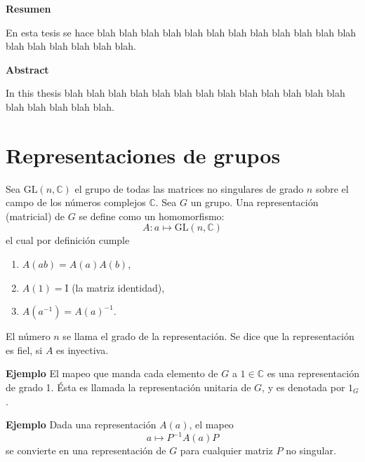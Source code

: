 \documentclass[12pt]{book}
\theoremstyle{definition}
\newcounter{in}
\newcounter{ini}
\begin{document}
\thispagestyle{empty}
\begin{flushleft}
  {\bfseries\Large Resumen}
\end{flushleft}

En esta tesis se hace blah blah blah blah blah blah blah blah blah
blah blah blah blah blah blah blah blah blah.

\vspace{2cm}

\begin{flushleft}
  {\bfseries\Large Abstract}
\end{flushleft}

In this thesis blah blah blah blah blah blah blah blah blah
blah blah blah blah blah blah blah blah blah.

 \newpage \thispagestyle{empty}

\chapter{Representaciones de grupos}
\label{cha:Representaciones de grupos}

Sea $ \mathrm{GL}(n,\mathbb{C})$ el grupo de todas las matrices no
singulares de grado $n$ sobre el campo de los números complejos
$\mathbb{C}$. Sea $G$ un grupo. Una representación (matricial) de $G$
se define como un homomorfismo:
\begin{equation*}
  A \colon a \mapsto \mathrm{GL}(n,\mathbb{C})
\end{equation*}
el cual por definición cumple
\begin{enumerate}
\item $A\left(ab\right)=A\left(a\right)A\left(b\right)$,
\item $A\left(1\right)=\mathrm{I}$ (la matriz identidad),
\item $A\left(a^{-1}\right)=A\left(a\right)^{-1}$.
\end{enumerate}
El número $n$ se llama el grado de la representación. Se dice que la
representación es fiel, si $A$ es inyectiva.

\textbf{Ejemplo} \label{Ej1} El mapeo que manda cada elemento de $G$ a $1
\in \mathbb{C}$ es una representación de grado 1. Ésta es llamada la
representación unitaria de $G$, y es denotada por $1_{G}$.

\textbf{Ejemplo} \label{Ej2} Dada una representación $A\left(a\right)$, el mapeo
\begin{equation*}
  a \mapsto P^{-1}A\left(a\right)P
\end{equation*}  
se convierte en una representación de $G$ para cualquier matriz $P$ no singular.
\end{document}
